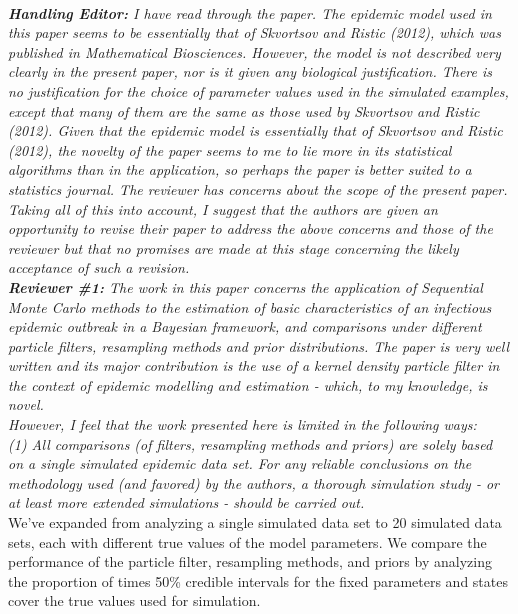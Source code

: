 \documentclass{article}
\begin{document}
 \\

\noindent \emph{{\bf Handling Editor:}  I have read through the paper.  The epidemic model used in this paper seems to be essentially that of Skvortsov and Ristic (2012), which was published in Mathematical Biosciences.  However, the model is not described very clearly in the present paper, nor is it given any biological justification.  There is no justification for the choice of parameter values used in the simulated examples, except that many of them are the same as those used by Skvortsov and Ristic (2012).  Given that the epidemic model is essentially that of Skvortsov and Ristic (2012), the novelty of the paper seems to me to lie more in its statistical algorithms than in the application, so perhaps the paper is better suited to a statistics journal.  The reviewer has concerns about the scope of the present paper.  Taking all of this into account, I suggest that the authors are given an opportunity to revise their paper to address the above concerns and those of the reviewer but that no promises are made at this stage concerning the likely acceptance of such a revision.} \\

\noindent \emph{{\bf Reviewer \#1:} The work in this paper concerns the application of Sequential Monte Carlo methods to the estimation of basic characteristics of an infectious epidemic outbreak in a Bayesian framework, and comparisons under different particle filters, resampling methods and prior distributions. The paper is very well written and its major contribution is the use of a kernel density particle filter in the context of epidemic modelling and estimation - which, to my knowledge, is novel.} \\

\noindent \emph{However, I feel that the work presented here is limited in the following ways:} \\

\noindent \emph{(1) All comparisons (of filters, resampling methods and priors) are solely based on a single simulated epidemic data set. For any reliable conclusions on the methodology used (and favored) by the authors, a thorough simulation study - or at least more extended simulations - should be carried out.} \\

We've expanded from analyzing a single simulated data set to 20 simulated data sets, each with different true values of the model parameters. We compare the performance of the particle filter, resampling methods, and priors by analyzing the proportion of times 50\% credible intervals for the fixed parameters and states cover the true values used for simulation. \\
\end{document}
